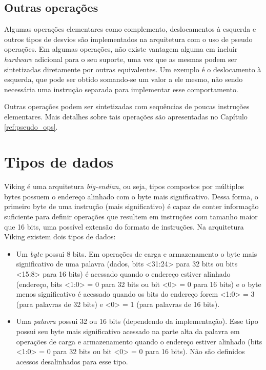 \documentclass{extreport}
\begin{document}
\subsection{Outras operações}
Algumas operações elementares como complemento, deslocamentos à esquerda e outros tipos de desvios são implementados na arquitetura com o uso de pseudo operações. Em algumas operações, não existe vantagem alguma em incluir \textit{hardware} adicional para o seu suporte, uma vez que as mesmas podem ser sintetizadas diretamente por outras equivalentes. Um exemplo é o deslocamento à esquerda, que pode ser obtido somando-se um valor a ele mesmo, não sendo necessária uma instrução separada para implementar esse comportamento.

Outras operações podem ser sintetizadas com sequências de poucas instruções elementares. Mais detalhes sobre tais operações são apresentadas no Capítulo \ref{ref:pseudo_ops}.

\section{Tipos de dados}
\label{ref:data_types}
Viking é uma arquitetura \textit{big-endian}, ou seja, tipos compostos por múltiplos bytes possuem o endereço alinhado com o byte mais significativo. Dessa forma, o primeiro byte de uma instrução (mais significativo) é capaz de conter informação suficiente para definir operações que resultem em instruções com tamanho maior que 16 bits, uma possível extensão do formato de instruções. Na arquitetura Viking existem dois tipos de dados:

\begin{itemize}
\item Um \textit{byte} possui 8 bits. Em operações de carga e armazenamento o byte mais significativo de uma palavra (dados, bits <31:24> para 32 bits ou bits <15:8> para 16 bits) é acessado quando o endereço estiver alinhado (endereço, bits <1:0> = 0 para 32 bits ou bit <0> = 0 para 16 bits) e o byte menos significativo é acessado quando os bits do endereço forem <1:0> = 3 (para palavras de 32 bits) e <0> = 1 (para palavras de 16 bits).
\item Uma \textit{palavra} possui 32 ou 16 bits (dependendo da implementação). Esse tipo possui seu byte mais significativo acessado na parte alta da palavra em operações de carga e armazenamento quando o endereço estiver alinhado (bits <1:0> = 0 para 32 bits ou bit <0> = 0 para 16 bits). Não são definidos acessos desalinhados para esse tipo.
\end{itemize}
\end{document}
